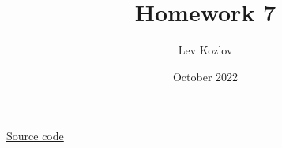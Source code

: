 \documentclass{article}
\title{Homework 7}
\author{Lev Kozlov}
\date{October 2022}
\begin{document}
\maketitle

\href{https://github.com/lvjonok/f22-theoretical-mechanics/tree/master/homework7}{Source code}


\end{document}
